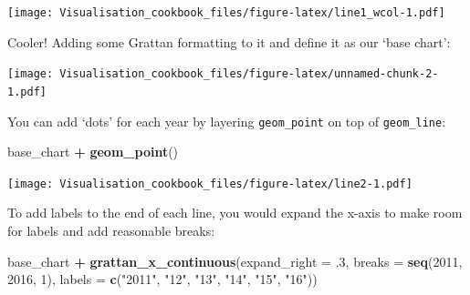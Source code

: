 \documentclass[]{book}
\newenvironment{Shaded}{\begin{snugshade}}{\end{snugshade}}
\newcommand{\DataTypeTok}[1]{\textcolor[rgb]{0.13,0.29,0.53}{#1}}
\newcommand{\DecValTok}[1]{\textcolor[rgb]{0.00,0.00,0.81}{#1}}
\newcommand{\FloatTok}[1]{\textcolor[rgb]{0.00,0.00,0.81}{#1}}
\newcommand{\KeywordTok}[1]{\textcolor[rgb]{0.13,0.29,0.53}{\textbf{#1}}}
\newcommand{\NormalTok}[1]{#1}
\newcommand{\OperatorTok}[1]{\textcolor[rgb]{0.81,0.36,0.00}{\textbf{#1}}}
\newcommand{\StringTok}[1]{\textcolor[rgb]{0.31,0.60,0.02}{#1}}
\begin{document}
\texttt{[image: Visualisation\_cookbook\_files/figure-latex/line1\_wcol-1.pdf]}

Cooler! Adding some Grattan formatting to it and define it as our `base chart':

\begin{Shaded}
\end{Shaded}

\texttt{[image: Visualisation\_cookbook\_files/figure-latex/unnamed-chunk-2-1.pdf]}

You can add `dots' for each year by layering \texttt{geom\_point} on top of \texttt{geom\_line}:

\begin{Shaded}
\begin{Highlighting}[]
\NormalTok{base_chart }\OperatorTok{+}
\StringTok{  }\KeywordTok{geom_point}\NormalTok{()}
\end{Highlighting}
\end{Shaded}

\texttt{[image: Visualisation\_cookbook\_files/figure-latex/line2-1.pdf]}

To add labels to the end of each line, you would expand the x-axis to make room for labels and add reasonable breaks:

\begin{Shaded}
\begin{Highlighting}[]
\NormalTok{base_chart }\OperatorTok{+}
\StringTok{  }\KeywordTok{grattan_x_continuous}\NormalTok{(}\DataTypeTok{expand_right =} \FloatTok{.3}\NormalTok{,}
                       \DataTypeTok{breaks =} \KeywordTok{seq}\NormalTok{(}\DecValTok{2011}\NormalTok{, }\DecValTok{2016}\NormalTok{, }\DecValTok{1}\NormalTok{),}
                       \DataTypeTok{labels =} \KeywordTok{c}\NormalTok{(}\StringTok{"2011"}\NormalTok{, }\StringTok{"12"}\NormalTok{, }\StringTok{"13"}\NormalTok{, }\StringTok{"14"}\NormalTok{, }\StringTok{"15"}\NormalTok{, }\StringTok{"16"}\NormalTok{)) }
\end{Highlighting}
\end{Shaded}
\end{document}
